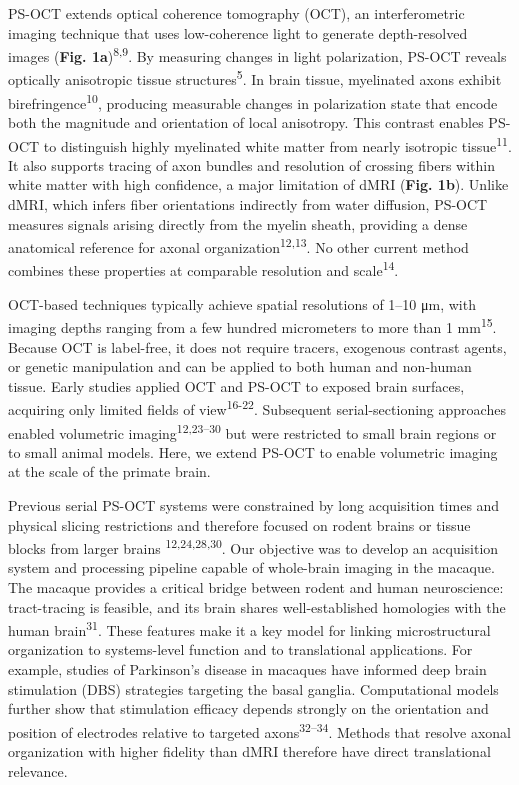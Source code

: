\documentclass{article}
\begin{document}
PS-OCT extends optical coherence tomography (OCT), an interferometric imaging technique that uses low-coherence light to generate depth-resolved images (\textbf{Fig. 1a})\textsuperscript{8,9}. By measuring changes in light polarization, PS-OCT reveals optically anisotropic tissue structures\textsuperscript{5}. In brain tissue, myelinated axons exhibit birefringence\textsuperscript{10}, producing measurable changes in polarization state that encode both the magnitude and orientation of local anisotropy. This contrast enables PS-OCT to distinguish highly myelinated white matter from nearly isotropic tissue\textsuperscript{11}. It also supports tracing of axon bundles and resolution of crossing fibers within white matter with high confidence, a major limitation of dMRI (\textbf{Fig. 1b}). Unlike dMRI, which infers fiber orientations indirectly from water diffusion, PS-OCT measures signals arising directly from the myelin sheath, providing a dense anatomical reference for axonal organization\textsuperscript{12,13}. No other current method combines these properties at comparable resolution and scale\textsuperscript{14}.

OCT-based techniques typically achieve spatial resolutions of 1–10 μm, with imaging depths ranging from a few hundred micrometers to more than 1 mm\textsuperscript{15}. Because OCT is label-free, it does not require tracers, exogenous contrast agents, or genetic manipulation and can be applied to both human and non-human tissue. Early studies applied OCT and PS-OCT to exposed brain surfaces, acquiring only limited fields of view\textsuperscript{16-22}. Subsequent serial-sectioning approaches enabled volumetric imaging\textsuperscript{12,23–30} but were restricted to small brain regions or to small animal models. Here, we extend PS-OCT to enable volumetric imaging at the scale of the primate brain.

Previous serial PS-OCT systems were constrained by long acquisition times and physical slicing restrictions and therefore focused on rodent brains or tissue blocks from larger brains \textsuperscript{12,24,28,30}. Our objective was to develop an acquisition system and processing pipeline capable of whole-brain imaging in the macaque. The macaque provides a critical bridge between rodent and human neuroscience: tract-tracing is feasible, and its brain shares well-established homologies with the human brain\textsuperscript{31}. These features make it a key model for linking microstructural organization to systems-level function and to translational applications. For example, studies of Parkinson’s disease in macaques have informed deep brain stimulation (DBS) strategies targeting the basal ganglia. Computational models further show that stimulation efficacy depends strongly on the orientation and position of electrodes relative to targeted axons\textsuperscript{32–34}. Methods that resolve axonal organization with higher fidelity than dMRI therefore have direct translational relevance.
\end{document}
